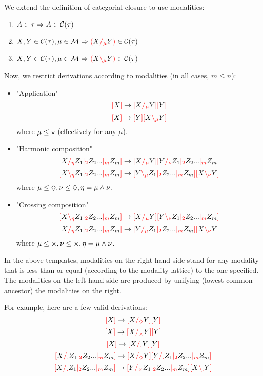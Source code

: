 \documentclass[main.tex]{subfiles}
\begin{document}
\begin{defn}
    We extend the definition of categorial closure to use modalities:
    \begin{enumerate}
        \item \label{cmod:atomic} $A \in \tau \Rightarrow A \in \cclos{\tau}$
        \item \label{cmod:right}  $X, Y \in \cclos{\tau}, \mu \in \mathcal{M} \Rightarrow \lp X \rci{\mu} Y \rp \in \cclos{\tau}$
        \item \label{cmod:left}   $X, Y \in \cclos{\tau}, \mu \in \mathcal{M} \Rightarrow \lp X \lci{\mu} Y \rp \in \cclos{\tau}$
    \end{enumerate}
\end{defn}

Now, we restrict derivations according to modalities (in all cases, $m \leq n$):
\begin{itemize}
    \item "Application"
        \[ \lb X \rb \rightarrow \lb X \rci{\mu} Y \rb \lb Y \rb \]
        \[ \lb X \rb \rightarrow \lb Y \rb \lb X \lci{\mu} Y \rb \]
        where $\mu \less \modstar$ (effectively for any $\mu$).
    \item "Harmonic composition"
        \[ \lb X \rci{\eta} Z_1 \mci{2} Z_2 ... \mci{m} Z_m \rb \rightarrow \lb X \rci{\mu} Y \rb \lb Y \rci{\nu} Z_1 \mci{2} Z_2 ... \mci{m} Z_m \rb \]
        \[ \lb X \lci{\eta} Z_1 \mci{2} Z_2 ... \mci{m} Z_m \rb \rightarrow \lb Y \lci{\mu} Z_1 \mci{2} Z_2 ... \mci{m} Z_m \rb \lb X \lci{\nu} Y \rb \]
        where $\mu \less \modr, \nu \less \modr, \eta = \mu \meet \nu$.
    \item "Crossing composition"
        \[ \lb X \lci{\eta} Z_1 \mci{2} Z_2 ... \mci{m} Z_m \rb \rightarrow \lb X \rci{\mu} Y \rb \lb Y \lci{\nu} Z_1 \mci{2} Z_2 ... \mci{m} Z_m \rb \]
        \[ \lb X \rci{\eta} Z_1 \mci{2} Z_2 ... \mci{m} Z_m \rb \rightarrow \lb Y \rci{\mu} Z_1 \mci{2} Z_2 ... \mci{m} Z_m \rb \lb X \lci{\nu} Y \rb \]
        where $\mu \less \modx, \nu \less \modx, \eta = \mu \meet \nu$.
\end{itemize}

In the above templates, modalities on the right-hand side stand for any
modality that is less-than or equal (according to the modality lattice)
to the one specified. The modalities on the left-hand side are produced by
unifying (lowest common ancestor) the modalities on the right.

\begin{example}
    For example, here are a few valid derivations:
    \[ \lb X \rb \rightarrow \lb X \rci{\modr} Y \rb \lb Y \rb \]
    \[ \lb X \rb \rightarrow \lb X \rci{\modx} Y \rb \lb Y \rb \]
    \[ \lb X \rb \rightarrow \lb X \rci{\moddot} Y \rb \lb Y \rb \]
    \[ \lb X \rci{\moddot} Z_1 \mci{2} Z_2 ... \mci{m} Z_m \rb \rightarrow \lb X \rci{\modr} Y \rb \lb Y \rci{\moddot} Z_1 \mci{2} Z_2 ... \mci{m} Z_m \rb \]
    \[ \lb X \rci{\moddot} Z_1 \mci{2} Z_2 ... \mci{m} Z_m \rb \rightarrow \lb Y \rci{\modx} Z_1 \mci{2} Z_2 ... \mci{m} Z_m \rb \lb X \lci{\moddot} Y \rb \]
\end{example}
\end{document}
